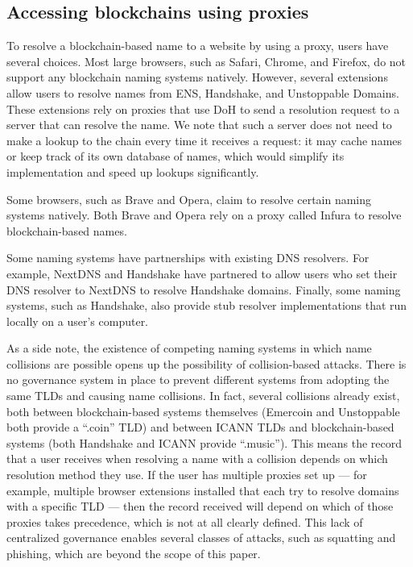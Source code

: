 


\subsection{Accessing blockchains using proxies}

To resolve a blockchain-based name to a website by using a proxy, users have 
several 
choices. Most large 
browsers, such as Safari, Chrome, and Firefox, do not support any 
blockchain 
naming systems natively. However, several extensions allow users to resolve 
names from ENS, 
Handshake, and Unstoppable Domains. These extensions rely on proxies that 
use 
DoH to send a resolution request to a server that can resolve the name. We 
note that such a server does not need to make a lookup to the chain every time 
it receives a request: it may cache names or keep track of its own database 
of names, which would simplify its implementation and speed up lookups 
significantly. 

Some browsers, such as Brave and Opera, claim to resolve certain naming 
systems 
natively.  Both Brave and Opera rely on a proxy called 
Infura to resolve blockchain-based names.  

Some naming systems have partnerships with existing DNS resolvers. For 
example, 
NextDNS and Handshake have partnered to allow users who set their DNS resolver 
to NextDNS to resolve Handshake domains. Finally, some naming systems, 
such as 
Handshake, also provide stub resolver implementations that run locally on a 
user's computer. 

As a side note, the existence of competing naming systems in which name 
collisions are possible 
opens up the possibility of collision-based attacks. There is no governance 
system in place to prevent different systems from adopting the same TLDs and 
causing name collisions. In fact, several collisions already exist, both 
between blockchain-based systems themselves (Emercoin and Unstoppable both 
provide a ``.coin'' TLD) and between ICANN TLDs and blockchain-based systems 
(both Handshake and ICANN provide ``.music''). 
This means the record that a user receives when resolving a name with a 
collision depends on which resolution method they use. If the user has 
multiple 
proxies set up --- for example, multiple browser extensions installed that 
each 
try to resolve domains with a specific TLD --- then the record received will 
depend on which of those proxies takes precedence, which is not at all 
clearly 
defined. This lack of centralized governance enables several classes of 
attacks, such as squatting 
and phishing, which are beyond the scope of this paper.

